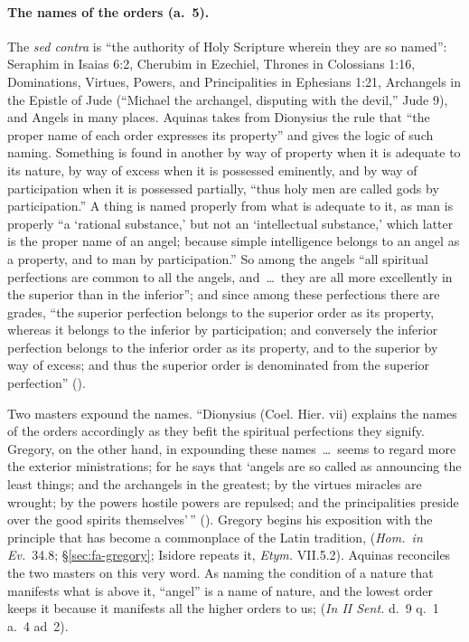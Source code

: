 \paragraph{The names of the orders (a.~5).} The \emph{sed contra} is ``the
authority of Holy Scripture wherein they are so named'': Seraphim in Isaias
6:2, Cherubim in Ezechiel, Thrones in Colossians 1:16, Dominations, Virtues,
Powers, and Principalities in Ephesians 1:21, Archangels in the Epistle of
Jude (``Michael the archangel, disputing with the devil,'' Jude 9), and
Angels in many places. Aquinas takes from Dionysius the rule that ``the
proper name of each order expresses its property'' and gives the logic of
such naming. Something is found in another by way of property when it is
adequate to its nature, by way of excess when it is possessed eminently, and
by way of participation when it is possessed partially, ``thus holy men are
called gods by participation.'' A thing is named properly from what is
adequate to it, as man is properly ``a `rational substance,' but not an
`intellectual substance,' which latter is the proper name of an angel;
because simple intelligence belongs to an angel as a property, and to man by
participation.'' So among the angels ``all spiritual perfections are common
to all the angels, and~\dots\ they are all more excellently in the superior
than in the inferior''; and since among these perfections there are grades,
``the superior perfection belongs to the superior order as its property,
whereas it belongs to the inferior by participation; and conversely the
inferior perfection belongs to the inferior order as its property, and to
the superior by way of excess; and thus the superior order is denominated
from the superior perfection'' ().

Two masters expound the names. ``Dionysius (Coel. Hier. vii) explains the
names of the orders accordingly as they befit the spiritual perfections they
signify. Gregory, on the other hand, in expounding these names~\dots\ seems
to regard more the exterior ministrations; for he says that `angels are so
called as announcing the least things; and the archangels in the greatest;
by the virtues miracles are wrought; by the powers hostile powers are
repulsed; and the principalities preside over the good spirits themselves'\,''
(). Gregory begins his exposition with the principle
that has become a commonplace of the Latin tradition,  (\emph{Hom.\ in Ev.}\ 34.8;
\S\ref{sec:fa-gregory}; Isidore repeats it, \emph{Etym.} VII.5.2).
Aquinas reconciles the two masters on this very word. As naming the
condition of a nature that manifests what is above it, ``angel'' is a name
of nature, and the lowest order keeps it because it manifests all the higher
orders to us;  (\emph{In II Sent.} d.~9 q.~1 a.~4 ad~2).


